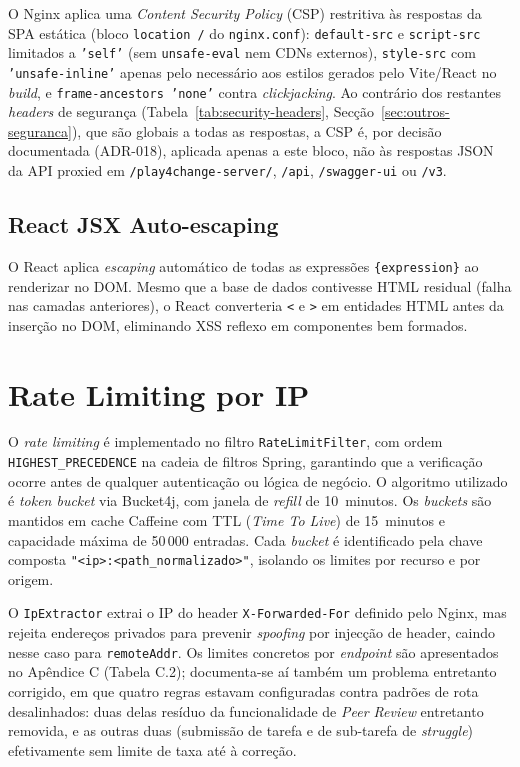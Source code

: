 O Nginx aplica uma \textit{Content Security Policy} (CSP) restritiva às respostas da SPA estática (bloco \texttt{location /} do \texttt{nginx.conf}): \texttt{default-src} e \texttt{script-src} limitados a \texttt{'self'} (sem \texttt{unsafe-eval} nem CDNs externos), \texttt{style-src} com \texttt{'unsafe-inline'} apenas pelo necessário aos estilos gerados pelo Vite/React no \textit{build}, e \texttt{frame-ancestors 'none'} contra \textit{clickjacking}. Ao contrário dos restantes \textit{headers} de segurança (Tabela~\ref{tab:security-headers}, Secção~\ref{sec:outros-seguranca}), que são globais a todas as respostas, a CSP é, por decisão documentada (ADR-018), aplicada apenas a este bloco, não às respostas JSON da API proxied em \texttt{/play4change-server/}, \texttt{/api}, \texttt{/swagger-ui} ou \texttt{/v3}.

\subsection*{React JSX Auto-escaping}

O React aplica \textit{escaping} automático de todas as expressões \texttt{\{expression\}} ao renderizar no DOM.
Mesmo que a base de dados contivesse HTML residual (falha nas camadas anteriores), o React converteria \texttt{<} e \texttt{>} em entidades HTML antes da inserção no DOM, eliminando XSS reflexo em componentes bem formados.

\section{Rate Limiting por IP} \label{sec:ratelimiting}

O \textit{rate limiting} é implementado no filtro \texttt{RateLimitFilter}, com ordem \texttt{HIGHEST\_PRECEDENCE} na cadeia de filtros Spring, garantindo que a verificação ocorre antes de qualquer autenticação ou lógica de negócio.
O algoritmo utilizado é \textit{token bucket} via Bucket4j, com janela de \textit{refill} de 10~minutos.
Os \textit{buckets} são mantidos em cache Caffeine com TTL (\textit{Time To Live}) de 15~minutos e capacidade máxima de 50\,000 entradas.
Cada \textit{bucket} é identificado pela chave composta \texttt{"<ip>:<path\_normalizado>"}, isolando os limites por recurso e por origem.

O \texttt{IpExtractor} extrai o IP do header \texttt{X-Forwarded-For} definido pelo Nginx, mas rejeita endereços privados para prevenir \textit{spoofing} por injecção de header, caindo nesse caso para \texttt{remoteAddr}.
Os limites concretos por \textit{endpoint} são apresentados no Apêndice C (Tabela C.2); documenta-se aí também um problema entretanto corrigido, em que quatro regras estavam configuradas contra padrões de rota desalinhados: duas delas resíduo da funcionalidade de \textit{Peer Review} entretanto removida, e as outras duas (submissão de tarefa e de sub-tarefa de \textit{struggle}) efetivamente sem limite de taxa até à correção.

